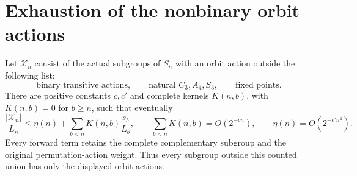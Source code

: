 \section{Exhaustion of the nonbinary orbit actions}
\label{sec:nonbinary-alphabet}

\begin{theorem}
\label{thm:nonbinary-alphabet}
Let $\mathcal X_n$ consist of the actual subgroups of $S_n$ with
an orbit action outside the following list:
\[
 \text{binary transitive actions},\qquad
 \text{natural }C_3,A_4,S_3,\qquad\text{fixed points}.
\]
There are positive constants $c,c'$ and complete kernels $K(n,b)$,
with $K(n,b)=0$ for $b\geq n$, such that eventually
\[
 \frac{|\mathcal X_n|}{L_n}
 \leq\eta(n)+\sum_{b<n}K(n,b)\frac{s_b}{L_b},\qquad
 \sum_{b<n}K(n,b)=O(2^{-cn}),\qquad
 \eta(n)=O(2^{-c'n^2}).
\]
Every forward term retains the complete complementary subgroup and
the original permutation-action weight. Thus every subgroup outside
this counted union has only the displayed orbit actions.
\end{theorem}
